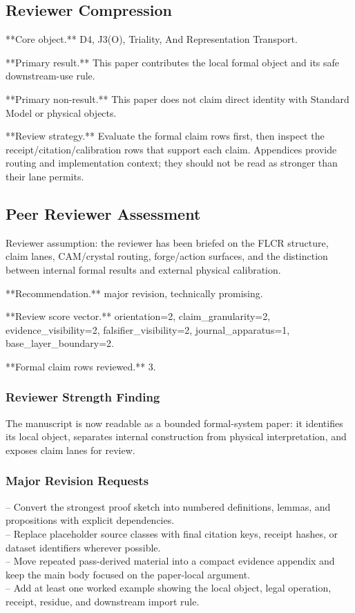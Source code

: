 \documentclass[11pt]{article}
\begin{document}
\subsection*{Reviewer Compression}

**Core object.** D4, J3(O), Triality, And Representation Transport.

**Primary result.** This paper contributes the local formal object and its safe downstream-use rule.

**Primary non-result.** This paper does not claim direct identity with Standard Model or physical objects.

**Review strategy.** Evaluate the formal claim rows first, then inspect the receipt/citation/calibration rows that support each claim. Appendices provide routing and implementation context; they should not be read as stronger than their lane permits.

\subsection*{Peer Reviewer Assessment}

Reviewer assumption: the reviewer has been briefed on the FLCR structure, claim lanes, CAM/crystal routing, forge/action surfaces, and the distinction between internal formal results and external physical calibration.

**Recommendation.** major revision, technically promising.

**Review score vector.** orientation=2, claim\_granularity=2, evidence\_visibility=2, falsifier\_visibility=2, journal\_apparatus=1, base\_layer\_boundary=2.

**Formal claim rows reviewed.** 3.

\subsubsection*{Reviewer Strength Finding}

The manuscript is now readable as a bounded formal-system paper: it identifies its local object, separates internal construction from physical interpretation, and exposes claim lanes for review.

\subsubsection*{Major Revision Requests}

\noindent{}-- Convert the strongest proof sketch into numbered definitions, lemmas, and propositions with explicit dependencies.\\
\noindent{}-- Replace placeholder source classes with final citation keys, receipt hashes, or dataset identifiers wherever possible.\\
\noindent{}-- Move repeated pass-derived material into a compact evidence appendix and keep the main body focused on the paper-local argument.\\
\noindent{}-- Add at least one worked example showing the local object, legal operation, receipt, residue, and downstream import rule.\\
\end{document}
